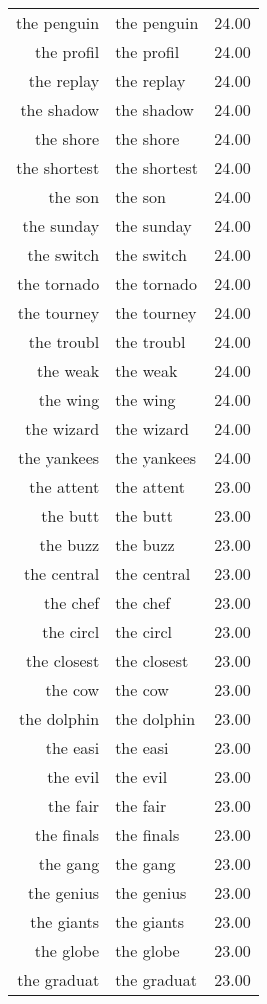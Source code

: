 \begin{table}[ht]
\begin{tabular}{rlr}
  the penguin & the penguin & 24.00 \\ 
  the profil & the profil & 24.00 \\ 
  the replay & the replay & 24.00 \\ 
  the shadow & the shadow & 24.00 \\ 
  the shore & the shore & 24.00 \\ 
  the shortest & the shortest & 24.00 \\ 
  the son & the son & 24.00 \\ 
  the sunday & the sunday & 24.00 \\ 
  the switch & the switch & 24.00 \\ 
  the tornado & the tornado & 24.00 \\ 
  the tourney & the tourney & 24.00 \\ 
  the troubl & the troubl & 24.00 \\ 
  the weak & the weak & 24.00 \\ 
  the wing & the wing & 24.00 \\ 
  the wizard & the wizard & 24.00 \\ 
  the yankees & the yankees & 24.00 \\ 
  the attent & the attent & 23.00 \\ 
  the butt & the butt & 23.00 \\ 
  the buzz & the buzz & 23.00 \\ 
  the central & the central & 23.00 \\ 
  the chef & the chef & 23.00 \\ 
  the circl & the circl & 23.00 \\ 
  the closest & the closest & 23.00 \\ 
  the cow & the cow & 23.00 \\ 
  the dolphin & the dolphin & 23.00 \\ 
  the easi & the easi & 23.00 \\ 
  the evil & the evil & 23.00 \\ 
  the fair & the fair & 23.00 \\ 
  the finals & the finals & 23.00 \\ 
  the gang & the gang & 23.00 \\ 
  the genius & the genius & 23.00 \\ 
  the giants & the giants & 23.00 \\ 
  the globe & the globe & 23.00 \\ 
  the graduat & the graduat & 23.00 \\ 

\end{tabular}
\end{table}
